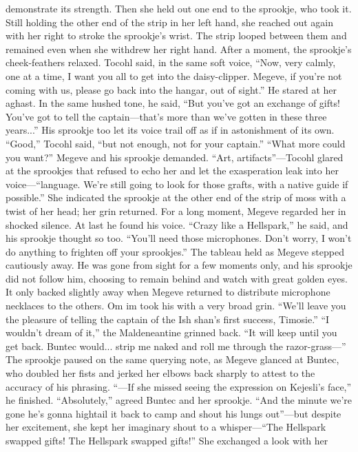 \documentclass[9pt]{article}
\begin{document}
demonstrate its strength. Then she held out one end to the sprookje, who took it. Still holding the other
end of the strip in her left hand, she reached out again with her right to stroke the sprookje’s wrist. The
strip looped between them and remained even when she withdrew her right hand.
After a moment, the sprookje’s cheek-feathers relaxed. Tocohl said, in the same soft voice, “Now,
very calmly, one at a time, I want you all to get into the daisy-clipper. Megeve, if you’re not coming with
us, please go back into the hangar, out of sight.”
He stared at her aghast. In the same hushed tone, he said, “But you’ve got an exchange of gifts!
You’ve got to tell the captain—that’s more than we’ve gotten in these three years...” His sprookje too
let its voice trail off as if in astonishment of its own.
“Good,” Tocohl said, “but not enough, not for your captain.”
“What more could you want?” Megeve and his sprookje demanded.
“Art, artifacts”—Tocohl glared at the sprookjes that refused to echo her and let the exasperation
leak into her voice—“language. We’re still going to look for those grafts, with a native guide if possible.”
She indicated the sprookje at the other end of the strip of moss with a twist of her head; her grin
returned.
For a long moment, Megeve regarded her in shocked silence. At last he found his voice. “Crazy like
a Hellspark,” he said, and his sprookje thought so too. “You’ll need those microphones. Don’t worry, I
won’t do anything to frighten off your sprookjes.”
The tableau held as Megeve stepped cautiously away. He was gone from sight for a few moments
only, and his sprookje did not follow him, choosing to remain behind and watch with great golden eyes. It
only backed slightly away when Megeve returned to distribute microphone necklaces to the others.
Om im took his with a very broad grin. “We’ll leave you the pleasure of telling the captain of the Ish
shan’s first success, Timosie.”
“I wouldn’t dream of it,” the Maldeneantine grinned back. “It will keep until you get back. Buntec
would... strip me naked and roll me through the razor-grass—” The sprookje paused on the same
querying note, as Megeve glanced at Buntec, who doubled her fists and jerked her elbows back sharply
to attest to the accuracy of his phrasing. “—If she missed seeing the expression on Kejesli’s face,” he
finished.
“Absolutely,” agreed Buntec and her sprookje. “And the minute we’re gone he’s gonna hightail it
back to camp and shout his lungs out”—but despite her excitement, she kept her imaginary shout to a
whisper—“The Hellspark swapped gifts! The Hellspark swapped gifts!” She exchanged a look with her
\end{document}
